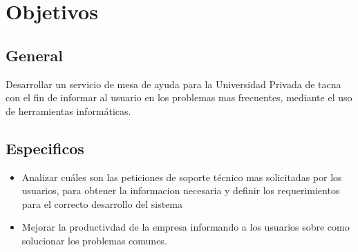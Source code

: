\documentclass[preprint,12pt]{elsarticle}
\begin{document}


\section{Objetivos}
\begin{figure}[htb]
	\begin{center}
	\end{center}
\end{figure}


\subsection{\textbf{General}}

Desarrollar un servicio de mesa de ayuda para la Universidad Privada de tacna con el fin de informar al usuario en los problemas mas frecuentes, mediante el uso de herramientas informáticas.


\subsection{\textbf{Especificos}}

\begin{itemize}

\item Analizar cuáles son las peticiones de soporte técnico mas solicitadas por los usuarios, para obtener la informacion necesaria y definir los requerimientos para el correcto desarrollo del sistema
\item Mejorar la productivdad de la empresa informando a los usuarios sobre como solucionar los problemas comunes.
\end{itemize}


 

\end{document}
